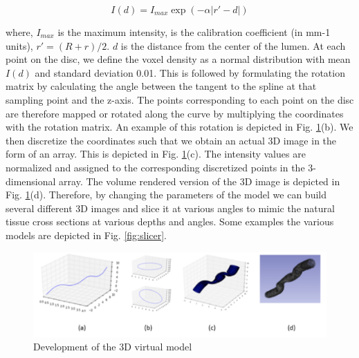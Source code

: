 \begin{equation}
I(d) = I_{max} \exp(- \alpha |r\prime - d|)
\label{eq:1}
\end{equation}


where, $I_{max}$  is the maximum intensity, is the calibration coefficient (in mm-1 units), $r\prime=(R+r)/2.$ $d$ is the distance from the center of the lumen. At each point on the disc, we define the voxel density as a normal distribution with mean $I(d)$ and standard deviation 0.01. This is followed by formulating the rotation matrix by calculating the angle between the tangent to the spline at that sampling point and the z-axis. The points corresponding to each point on the disc are therefore mapped or rotated along the curve by multiplying the coordinates with the rotation matrix. An example of this rotation is depicted in Fig. \ref{fig:3D_model}(b). We then discretize the coordinates such that we obtain an actual 3D image in the form of an array. This is depicted in Fig. \ref{fig:3D_model}(c). The intensity values are normalized and assigned to the corresponding discretized points in the 3-dimensional array. The volume rendered version of the 3D image is depicted in Fig. \ref{fig:3D_model}(d). Therefore, by changing the parameters of the model we can build several different 3D images and slice it at various angles to mimic the natural tissue cross sections at various depths and angles. Some examples the various models are depicted in Fig. \ref{fig:slicer}.

\begin{figure}[ht!]
\centering
\includegraphics[width=1.0\textwidth]{img/3D_model}
\caption{Development of the 3D virtual model}
\label{fig:3D_model}
\end{figure}

